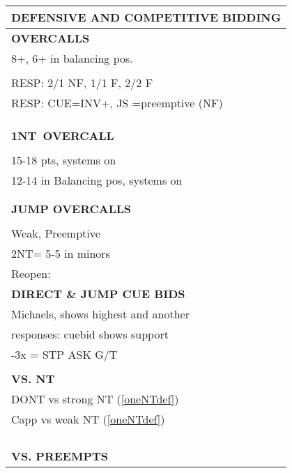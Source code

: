 \documentclass{article}
\newcommand\N{{\footnotesize NT}}
\begin{document}
\noindent
\small{
\begin{minipage}{90mm}
	\begin{tabular}{| p{88mm} |}
		\hline
		\cellcolor[gray]{0.9} \textbf{DEFENSIVE AND COMPETITIVE BIDDING} \\ \hline
		\textbf{OVERCALLS} \\ \hline
                8+, 6+ in balancing pos.
		\\ \hline
		\\ \hline
                RESP: 2/1 NF, 1/1 F, 2/2 F
		\\ \hline
                RESP: CUE=INV+, JS =preemptive (NF)
		\\ \hline
		\\ \hline
		\\ \hline
		\\ \hline
		\textbf{1\N \ OVERCALL} \\ \hline
		\\ \hline
                15-18 pts, systems on
		\\ \hline
                12-14 in Balancing pos, systems on
		\\ \hline
		\\ \hline
		\\ \hline
		\textbf{JUMP OVERCALLS} \\ \hline
		\\ \hline
                Weak, Preemptive
		\\ \hline
                2NT= 5-5 in minors
		\\ \hline
		Reopen: \\ \hline
		\textbf{DIRECT \& JUMP CUE BIDS} \\ \hline
                Michaels, shows highest and another
		\\ \hline
                responses: cuebid shows support
		\\ \hline
                [2x]-3x = STP ASK G/T 
		\\ \hline
		\\ \hline
		\textbf{VS. NT} \\ \hline
                DONT vs strong NT (\ref{oneNTdef})
		\\ \hline
                Capp vs weak NT (\ref{oneNTdef})
		\\ \hline
		\\ \hline
		\\ \hline
		\\ \hline
		\\ \hline
		\textbf{VS. PREEMPTS} \\ \hline

\end{tabular}
\end{minipage}}
\end{document}
